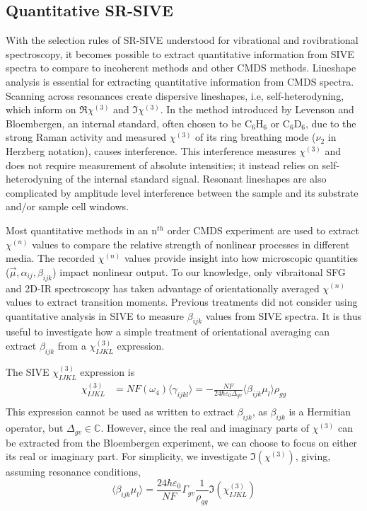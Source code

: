 \documentclass[aip, jcp, draft, onecolumn]{revtex4-2}
\begin{document}
\subsection{Quantitative SR-SIVE}
With the selection rules of SR-SIVE understood for vibrational and rovibrational spectroscopy, it becomes possible to extract quantitative information from SIVE spectra to compare to incoherent methods and other CMDS methods.
Lineshape analysis is essential for extracting quantitative information from CMDS spectra.
Scanning across resonances create dispersive lineshapes, i.e, self-heterodyning, which inform on $\Re{\chi^{(3)}}$ and $\Im{\chi^{(3)}}$.\cite{Levenson1974_1, Levenson1974_2}
In the method introduced by Levenson and Bloembergen, an internal standard, often chosen to be  
C$_6$H$_6$ or C$_6$D$_6$, due to the strong Raman activity and measured $\chi^{(3)}$ of its ring breathing mode ($\nu_2$ in Herzberg notation), causes interference. \cite{Levenson1974_2, RN351, RN345}
This interference measures $\chi^{(3)}$ and does not require measurement of absolute intensities; it instead relies on self-heterodyning of the internal standard signal. 
Resonant lineshapes are also complicated by amplitude level interference between the sample and its substrate and/or sample cell windows. \cite{RN362, RN418}

Most quantitative methods in an n$^{th}$ order CMDS experiment are used to extract $\chi^{(n)}$ values to compare the relative strength of nonlinear processes in different media. \cite{Zhu87, RN351, RN345}
The recorded $\chi^{(n)}$ values provide insight into how microscopic quantities ($\vec{\mu}, \alpha_{ij}, \beta_{ijk}$) impact nonlinear output.
To our knowledge, only vibraitonal SFG and 2D-IR spectroscopy has taken advantage of orientationally averaged $\chi^{(n)}$ values to extract transition moments. \cite{Shen90, Moilanen2009, RN245}
Previous treatments did not consider using quantitative analysis in SIVE to measure $\beta_{ijk}$ values from SIVE spectra.
It is thus useful to investigate how a simple treatment of orientational averaging can extract $\beta_{ijk}$ from a $\chi^{(3)}_{IJKL}$ expression.

The SIVE $\chi^{(3)}_{IJKL}$ expression is
\begin{equation}\label{chi3}
\begin{split}
		\chi^{(3)}_{IJKL} &= NF(\omega_4) \langle \gamma_{ijkl} \rangle = -\frac{NF}{24 \hbar \varepsilon_0 \Delta_{gv}} \langle \beta_{ijk} \mu_l \rangle \rho_{gg}\\
\end{split}
\end{equation}
This expression cannot be used as written to extract $\beta_{ijk}$, as $\beta_{ijk}$ is a Hermitian operator, but $\Delta_{gv} \in \mathbb{C}$. 
However, since the real and imaginary parts of $\chi^{(3)}$ can be extracted from the Bloembergen experiment, we can choose to focus on either its real or imaginary part.
For simplicity, we investigate $\Im(\chi^{(3)})$, giving, assuming resonance conditions, 
\begin{equation}
	\langle \beta_{ijk} \mu_{l} \rangle = \frac{24 \hbar \varepsilon_0}{NF} \Gamma_{gv} \frac{1}{\rho_{gg}} \Im(\chi^{(3)}_{IJKL})
\end{equation}
\end{document}
